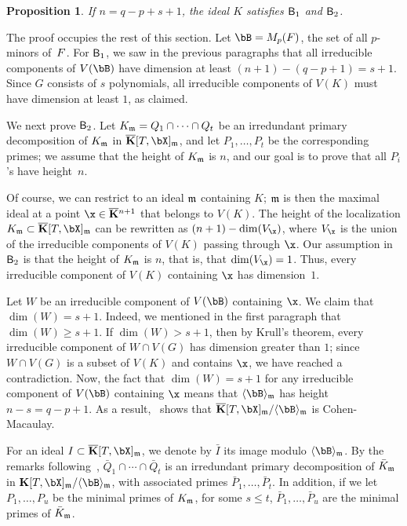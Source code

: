 \documentclass[12pt]{article}
\newtheorem{proposition}[definition]{Proposition}
\begin{document}
\begin{proposition}\label{prop:KH1H2}
  If $n=q-p+s+1$, the ideal $K$ satisfies $\mathsf{B}_1$ and $\mathsf{B}_2$.
\end{proposition}

The proof occupies the rest of this section. Let $\bB=M_p(\mF)$, the
set of all $p$-minors of~${F}$. For $\mathsf{B}_1$, we saw in the previous
paragraphs that all irreducible components of $V(\bB)$ have dimension
at least $(n+1)-(q-p+1)=s+1$. Since $G$ consists of $s$ polynomials,
all irreducible components of $V(K)$ must have dimension at least $1$,
as claimed.

We next prove $\mathsf{B}_2$. Let $K_{\mathfrak{m}}=Q_1 \cap \cdots \cap Q_t$ be an
irredundant primary decomposition of $K_{\mathfrak{m}}$ in $\KKbar[T,\bX]_\m$, and
let $P_1,\dots,P_t$ be the corresponding primes; we assume that the
height of $K_{\mathfrak{m}}$ is $n$, and our goal is to prove that all $P_i$'s
have height~$n$.

Of course, we can restrict to an ideal $\mathfrak{m}$ containing $K$; $\mathfrak{m}$ is
then the maximal ideal at a point $\x \in \KKbar{}^{n+1}$ that belongs
to $V(K)$. The height of the localization
$K_\m \subset \KKbar[T,\bX]_\m$ can be rewritten as
$(n+1)-\dim(V_\x)$, where $V_\x$ is the union of the irreducible
components of $V(K)$ passing through $\x$. Our assumption in $\mathsf{B}_2$
is that the height of $K_{\mathfrak{m}}$ is $n$, that is, that
$\dim(V_\x)=1$. Thus, every irreducible component of $V(K)$ containing
$\x$ has dimension~$1$.

Let $W$ be an irreducible component of $V(\bB)$ containing $\x$.  We
claim that $\dim(W)=s+1$. Indeed, we mentioned in the first paragraph
that $\dim(W) \ge s+1$. If $\dim(W) > s+1$, then by Krull's theorem,
every irreducible component of $W \cap V(G)$ has dimension greater
than $1$; since $W \cap V(G)$ is a subset of $V(K)$ and contains $\x$,
we have reached a contradiction. Now, the fact that $\dim(W)=s+1$ for
any irreducible component of $V(\bB)$ containing $\x$ means that
$\langle \bB \rangle_\m$ has height $n-s=q-p+1$.  As a
result,~\cite[Theorem~18.18]{Eisenbud95} shows that
$\KKbar[T,\bX]_\m/\langle \bB \rangle_\m$ is Cohen-Macaulay.

For an ideal $I \subset \KKbar[T,\bX]_\m$, we denote by $\bar I$ its
image modulo $\langle \bB \rangle_\m$.  By the remarks
following~\cite[Theorem~IV.5.9]{ZaSa58},
$\bar Q_1 \cap \cdots \cap \bar Q_t$ is an irredundant primary
decomposition of $\bar K_{\mathfrak{m}}$ in
$\KK[T,\bX]_\m/\langle \bB \rangle_\m$, with associated primes
$\bar P_1,\dots,\bar P_t$. In addition, if we let $P_1,\dots,P_u$ be
the minimal primes of $K_{\mathfrak{m}}$, for some $s \le t$,
$\bar P_1,\dots,\bar P_u$ are the minimal primes of $\bar K_{\mathfrak{m}}$.
\end{document}
